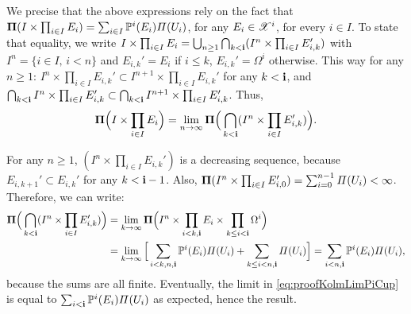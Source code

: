 We precise that the above expressions rely on the fact that $\mathbf{\Pi}(I\times\prod_{i\in I}E_i)=\sum_{i\in I}\mathbb{P}^i(E_i)\varPi(U_i)$, for any $E_i\in\mathscr{X}^i$, for every ${i\in I}$. To state that equality, we write $I\times\prod_{i\in I}E_i=\bigcup_{n\geq1}\bigcap_{k<\mathbf{i}}(I^n\times\prod_{i\in I}E_{i,k}') $ with $I^n=\{i\in I,\,i< n\}$ and $E_{i,k}'=E_i$ if $i\leq k$, $E_{i,k}'=\Omega^i$ otherwise. This way for any $n\geq1$:
$I^n\times\prod_{i\in I} E_{i,k}' \subset I^{n+1}\times\prod_{i\in I} E_{i,k}'$ for any $k<\mathbf{i}$, and
$        \bigcap_{k<\mathbf{i}} I^n\times\prod_{i\in I} E_{i,k}'\subset \bigcap_{k<\mathbf{i}} I^{n+1}\times\prod_{i\in I} E_{i,k}'$.
Thus,
    \begin{equation}\label{eq:proofKolmLimPiCup}
        \mathbf{\Pi}\Big(I\times\prod_{i\in I}E_i\Big) 
            = \lim_{n\rightarrow\infty}\mathbf{\Pi}\Big(\bigcap_{k<\mathbf{i}}(I^n\times\prod_{i\in I}E_{i,k}')\Big).
    \end{equation}


For any $n\geq1$, $ %
(I^n\times\prod_{i\in I}E_{i,k}')$ is a decreasing sequence, because $E_{i,k+1}'\subset E_{i,k}'$ for any $k<\mathbf{i}-1$. 
Also, $\mathbf{\Pi}(I^n\times\prod_{i\in I}E_{i,0}')=\sum_{i=0}^{n-1}\varPi(U_i)<\infty$.
Therefore, we can write:
    \begin{align}
        \mathbf{\Pi}\Big(\bigcap_{k<\mathbf{i}}(I^n\times\prod_{i\in I}E_{i,k}')\Big) 
            &= \lim_{k\rightarrow\infty} \mathbf{\Pi}\Big(I^n\times\prod_{i<k,\mathbf{i}}E_i\times\prod_{k\leq i<\mathbf{i}}\Omega^i\Big) \\
            &= \lim_{k\rightarrow\infty} \Big[\sum_{i<k,n,\mathbf{i}}\mathbb{P}^i(E_i)\varPi(U_i)  + \sum_{k\leq i<n,\mathbf{i}}\varPi(U_i)\Big]=\sum_{i<n,\mathbf{i}}\mathbb{P}^i(E_i)\varPi(U_i),\nonumber
    \end{align}
because the sums are all finite. Eventually, the limit in \cref{eq:proofKolmLimPiCup} is equal to $\sum_{i<\mathbf{i}}\mathbb{P}^i(E_i)\varPi(U_i)$ as expected, hence the result.






